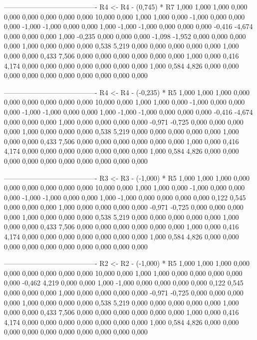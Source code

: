\documentclass[12pt]{article}
\begin{document}
\begin{enumerate}
\begin{keluaran}
----------------------------------------
R4 <- R4 - (0,745) * R7
1,000   1,000   1,000   0,000   0,000   0,000   0,000   0,000   0,000   10,000
0,000   1,000   1,000   0,000   -1,000  0,000   0,000   0,000   -1,000  -1,000
0,000   0,000   1,000   -1,000  -1,000  0,000   0,000   0,000   -0,416  -4,674
0,000   0,000   0,000   1,000   -0,235  0,000   0,000   0,000   -1,098  -1,952
0,000   0,000   0,000   0,000   1,000   0,000   0,000   0,000   0,538   5,219
0,000   0,000   0,000   0,000   0,000   1,000   0,000   0,000   0,433   7,506
0,000   0,000   0,000   0,000   0,000   0,000   1,000   0,000   0,416   4,174
0,000   0,000   0,000   0,000   0,000   0,000   0,000   1,000   0,584   4,826
0,000   0,000   0,000   0,000   0,000   0,000   0,000   0,000   0,000   0,000

----------------------------------------
R4 <- R4 - (-0,235) * R5
1,000   1,000   1,000   0,000   0,000   0,000   0,000   0,000   0,000   10,000
0,000   1,000   1,000   0,000   -1,000  0,000   0,000   0,000   -1,000  -1,000
0,000   0,000   1,000   -1,000  -1,000  0,000   0,000   0,000   -0,416  -4,674
0,000   0,000   0,000   1,000   0,000   0,000   0,000   0,000   -0,971  -0,725
0,000   0,000   0,000   0,000   1,000   0,000   0,000   0,000   0,538   5,219
0,000   0,000   0,000   0,000   0,000   1,000   0,000   0,000   0,433   7,506
0,000   0,000   0,000   0,000   0,000   0,000   1,000   0,000   0,416   4,174
0,000   0,000   0,000   0,000   0,000   0,000   0,000   1,000   0,584   4,826
0,000   0,000   0,000   0,000   0,000   0,000   0,000   0,000   0,000   0,000

----------------------------------------
R3 <- R3 - (-1,000) * R5
1,000   1,000   1,000   0,000   0,000   0,000   0,000   0,000   0,000   10,000
0,000   1,000   1,000   0,000   -1,000  0,000   0,000   0,000   -1,000  -1,000
0,000   0,000   1,000   -1,000  0,000   0,000   0,000   0,000   0,122   0,545
0,000   0,000   0,000   1,000   0,000   0,000   0,000   0,000   -0,971  -0,725
0,000   0,000   0,000   0,000   1,000   0,000   0,000   0,000   0,538   5,219
0,000   0,000   0,000   0,000   0,000   1,000   0,000   0,000   0,433   7,506
0,000   0,000   0,000   0,000   0,000   0,000   1,000   0,000   0,416   4,174
0,000   0,000   0,000   0,000   0,000   0,000   0,000   1,000   0,584   4,826
0,000   0,000   0,000   0,000   0,000   0,000   0,000   0,000   0,000   0,000

----------------------------------------
R2 <- R2 - (-1,000) * R5
1,000   1,000   1,000   0,000   0,000   0,000   0,000   0,000   0,000   10,000
0,000   1,000   1,000   0,000   0,000   0,000   0,000   0,000   -0,462  4,219
0,000   0,000   1,000   -1,000  0,000   0,000   0,000   0,000   0,122   0,545
0,000   0,000   0,000   1,000   0,000   0,000   0,000   0,000   -0,971  -0,725
0,000   0,000   0,000   0,000   1,000   0,000   0,000   0,000   0,538   5,219
0,000   0,000   0,000   0,000   0,000   1,000   0,000   0,000   0,433   7,506
0,000   0,000   0,000   0,000   0,000   0,000   1,000   0,000   0,416   4,174
0,000   0,000   0,000   0,000   0,000   0,000   0,000   1,000   0,584   4,826
0,000   0,000   0,000   0,000   0,000   0,000   0,000   0,000   0,000   0,000


\end{keluaran}
\end{enumerate}
\end{document}
